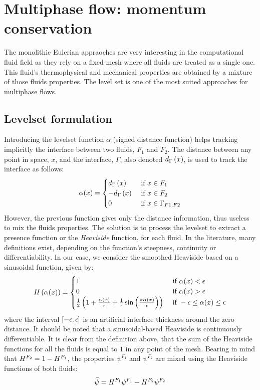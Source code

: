 \documentclass[11pt,a4paper]{article}
\begin{document}
\section{Multiphase flow: momentum conservation}
The monolithic Eulerian appraoches are very interesting in the computational fluid field as they rely on a fixed mesh
where all fluids are treated as a single one. This fluid's thermophysical and mechanical properties are obtained by a 
mixture of those fluids properties. The level set is one of the most suited approaches for multiphase flows.
\subsection{Levelset formulation}
Introducing the levelset function $\alpha$ (signed distance function) helps tracking implicitly the interface between two fluids, $F_1$ and $F_2$.
The distance between any point in space, $x$, and the interface, $\Gamma$, also denoted $d_{\Gamma} \left( x \right)$, is used to track the interface as follows:
\begin{align}
\alpha(x) = 
\begin{cases}
 d_{\Gamma} \left( x \right) 		& \text{ if } x \in F_1 \\ 
 -d_{\Gamma} \left( x \right)	 	& \text{ if } x \in F_2 \\ 
 0 							& \text{ if } x \in \Gamma_{F1, F2} 
\end{cases}
\end{align}
However, the previous function gives only the distance information, thus useless to mix the fluids properties.
The solution is to process the levelset to extract a presence function or the \emph{Heaviside} function, for each fluid.
In the literature, many definitions exist, depending on the function's steepness, continuity or differentiability. In our case, we consider the 
smoothed Heaviside based on a sinusoidal function, given by:
\begin{align}
H\left( \alpha(x) \right) = 
\begin{cases}
	1  & \text{ if } \alpha(x) < \epsilon \\
    0  & \text{ if } \alpha(x) > \epsilon \\  
    \frac{1}{2} \left( 1+ \frac{\alpha(x)}{\epsilon} + \frac{1}{\epsilon}\sin \left( \frac{\pi \alpha(x)}{\epsilon } \right)  \right) & \text{ if } - \epsilon \leq \alpha(x) \leq \epsilon
\end{cases}
\end{align}
where the interval $\left[ -\epsilon; \epsilon \right]$ is an artificial interface thickness around the zero distance. 
It should be noted that a sinusoidal-based Heaviside is continuously differentiable.
It is clear from the definition above, that the sum of the Heaviside functions for all the fluids is equal to $1$
in any point of the mesh. Bearing in mind that $H^{F_2} = 1-H^{F_1}$, the properties $\psi^{F_1}$ and $\psi^{F_2}$ 
are mixed using the Heaviside functions of both fluids:
\begin{align}
\label{eq:mixing}
\widehat{\psi} = H^{F_1} \psi^{F_1} + H^{F_2} \psi^{F_2}
\end{align}
\end{document}
